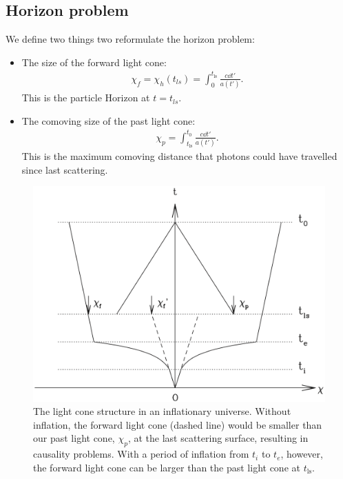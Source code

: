 \subsection{Horizon problem}
We define two things two reformulate the horizon problem:
\begin{itemize}
	\item The size of the forward light cone:
	\begin{align*}
		\chi_f = \chi_h(t_{ls}) = \int_0 ^{t_\text{ls}} \frac{c \dd{t'}}{a(t')}.
	\end{align*}
	This is the particle Horizon at $t= t_{ls}$.
	\item The comoving size of the past light cone:
	\begin{align*}
		\chi_p = \int_{t_\text{ls}}^{t_0} \frac{c \dd{t'}}{a(t')}.
	\end{align*}
	This is the maximum comoving distance that photons could have travelled since last scattering.
\end{itemize}

\begin{figure}
	\centering
	\includegraphics[width=\textwidth]{img/ch-02/inflation.png}
	\caption{The light cone structure in an inflationary universe. Without inflation, the forward light cone (dashed line) would be smaller than our past light cone, $\chi_p$, at the last scattering surface, resulting in causality problems. With a period of inflation from $t_i$ to $t_e$, however, the forward light cone can be larger than the past light cone at $t_\text{ls}$.}
	\label{fig:inflation}
\end{figure}


